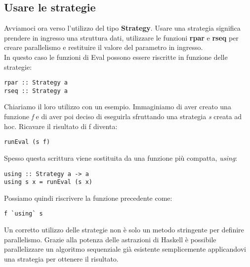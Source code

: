 \subsection{Usare le strategie}
Avviamoci ora verso l'utilizzo del tipo \textbf{Strategy}. Usare una strategia significa prendere in ingresso una struttura dati, utilizzare le funzioni \textbf{rpar} e \textbf{rseq} per creare parallelismo e restituire il valore del parametro in ingresso.\\
In questo caso le funzioni di Eval possono essere riscritte in funzione delle strategie:
\begin{verbatim}
rpar :: Strategy a
rseq :: Strategy a
\end{verbatim}
Chiariamo il loro utilizzo con un esempio. Immaginiamo di aver creato una funzione \textit{f} e di aver poi deciso di eseguirla sfruttando una strategia \textit{s} creata ad hoc. Ricavare il risultato di f diventa:
\begin{verbatim}
runEval (s f)
\end{verbatim}
Spesso questa scrittura viene sostituita da una funzione più compatta, \textit{using}:
\begin{verbatim}
using :: Strategy a -> a
using s x = runEval (s x)
\end{verbatim}
Possiamo quindi riscrivere la funzione precedente come:
\begin{verbatim}
f `using` s
\end{verbatim}
Un corretto utilizzo delle strategie non è solo un metodo stringente per definire parallelismo. Grazie alla potenza delle astrazioni di Haskell è possibile parallelizzare un algoritmo sequenziale già esistente semplicemente applicandovi una strategia per ottenere il risultato.\\
